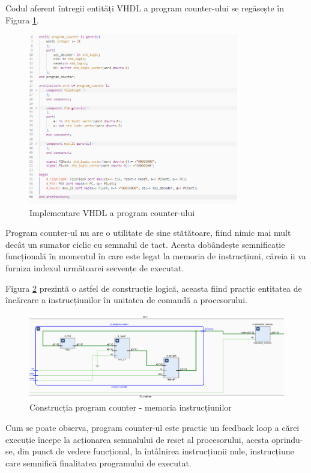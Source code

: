 \documentclass[12pt]{article}
\begin{document}
 \newpage
Codul aferent întregii entități VHDL a program counter-ului se regăsește în Figura \ref{Figura:38}.
 \begin{figure}[h!]
 \includegraphics[width=0.815\textwidth]{programcountercode.png}
 \centering
 \caption{Implementare VHDL a program counter-ului}
 \label{Figura:38}
 \end{figure}
 
 Program counter-ul nu are o utilitate de sine stătătoare, fiind nimic mai mult decât un sumator ciclic cu semnalul de tact. Acesta dobândește semnificație funcțională în momentul în care este legat la memoria de instrucțiuni, căreia ii va furniza indexul următoarei secvențe de executat.
 
 Figura  \ref{Figura:39} prezintă o astfel de construcție logică, aceasta fiind practic entitatea de încărcare a instrucțiunilor în unitatea de comandă a procesorului.
 
  \begin{figure}[h!]
 \includegraphics[width=1.0\textwidth]{pcinstmem2.png}
 \centering
 \caption{Construcția program counter - memoria instrucțiunilor}
 \label{Figura:39}
 \end{figure}
 
 Cum se poate observa, program counter-ul este practic un feedback loop a cărei execuție începe la acționarea semnalului de reset al procesorului, acesta oprindu-se, din punct de vedere funcțional, la întâlnirea instrucțiunii nule, instrucțiune care semnifică finalitatea programului de executat.
 
\end{document}
